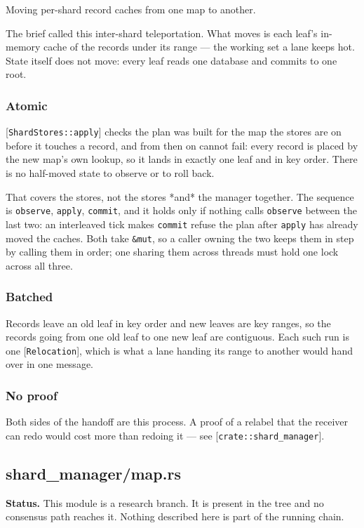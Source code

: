 \documentclass[11pt,a4paper]{article}
\begin{document}
Moving per-shard record caches from one map to another.

The brief called this inter-shard teleportation. What moves is each leaf's
in-memory cache of the records under its range — the working set a lane
keeps hot. State itself does not move: every leaf reads one database and
commits to one root.

\subsubsection{Atomic}

[\texttt{ShardStores::apply}] checks the plan was built for the map the stores are
on before it touches a record, and from then on cannot fail: every record
is placed by the new map's own lookup, so it lands in exactly one leaf and in
key order. There is no half-moved state to observe or to roll back.

That covers the stores, not the stores *and* the manager together. The
sequence is \texttt{observe}, \texttt{apply}, \texttt{commit}, and it holds only if nothing
calls \texttt{observe} between the last two: an interleaved tick makes \texttt{commit}
refuse the plan after \texttt{apply} has already moved the caches. Both take
\texttt{\&mut}, so a caller owning the two keeps them in step by calling them in
order; one sharing them across threads must hold one lock across all three.

\subsubsection{Batched}

Records leave an old leaf in key order and new leaves are key ranges, so the
records going from one old leaf to one new leaf are contiguous. Each such run
is one [\texttt{Relocation}], which is what a lane handing its range to another
would hand over in one message.

\subsubsection{No proof}

Both sides of the handoff are this process. A proof of a relabel that the
receiver can redo would cost more than redoing it — see
[\texttt{crate::shard\_manager}].

\subsection{shard\_manager/map.rs}
\begin{framed}\noindent\textbf{Status.} This module is a research branch. It is present in the tree and no consensus path reaches it. Nothing described here is part of the running chain.\end{framed}
\end{document}
